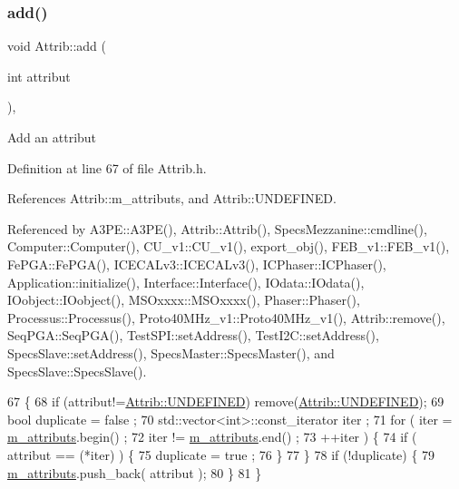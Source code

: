 \subsubsection{\texorpdfstring{add()}{add()}}
{\footnotesize\ttfamily void Attrib\+::add (\begin{DoxyParamCaption}\item[{int}]{attribut }\end{DoxyParamCaption})\hspace{0.3cm}{\ttfamily [inline]}, {\ttfamily [inherited]}}

Add an attribut 

Definition at line 67 of file Attrib.\+h.



References Attrib\+::m\+\_\+attributs, and Attrib\+::\+U\+N\+D\+E\+F\+I\+N\+ED.



Referenced by A3\+P\+E\+::\+A3\+P\+E(), Attrib\+::\+Attrib(), Specs\+Mezzanine\+::cmdline(), Computer\+::\+Computer(), C\+U\+\_\+v1\+::\+C\+U\+\_\+v1(), export\+\_\+obj(), F\+E\+B\+\_\+v1\+::\+F\+E\+B\+\_\+v1(), Fe\+P\+G\+A\+::\+Fe\+P\+G\+A(), I\+C\+E\+C\+A\+Lv3\+::\+I\+C\+E\+C\+A\+Lv3(), I\+C\+Phaser\+::\+I\+C\+Phaser(), Application\+::initialize(), Interface\+::\+Interface(), I\+Odata\+::\+I\+Odata(), I\+Oobject\+::\+I\+Oobject(), M\+S\+Oxxxx\+::\+M\+S\+Oxxxx(), Phaser\+::\+Phaser(), Processus\+::\+Processus(), Proto40\+M\+Hz\+\_\+v1\+::\+Proto40\+M\+Hz\+\_\+v1(), Attrib\+::remove(), Seq\+P\+G\+A\+::\+Seq\+P\+G\+A(), Test\+S\+P\+I\+::set\+Address(), Test\+I2\+C\+::set\+Address(), Specs\+Slave\+::set\+Address(), Specs\+Master\+::\+Specs\+Master(), and Specs\+Slave\+::\+Specs\+Slave().


\begin{DoxyCode}
67                             \{
68     \textcolor{keywordflow}{if} (attribut!=\hyperlink{classAttrib_a69e171d7cc6417835a5a306d3c764235a3a8da2ab97dda18aebab196fe4100531}{Attrib::UNDEFINED}) \textcolor{keyword}{remove}(\hyperlink{classAttrib_a69e171d7cc6417835a5a306d3c764235a3a8da2ab97dda18aebab196fe4100531}{Attrib::UNDEFINED});
69     \textcolor{keywordtype}{bool} duplicate = false ;
70     std::vector<int>::const\_iterator iter ;
71     \textcolor{keywordflow}{for} ( iter  = \hyperlink{classAttrib_ac4bd58a0cc6b38a3b711d609a3d3aacc}{m\_attributs}.begin() ;
72           iter != \hyperlink{classAttrib_ac4bd58a0cc6b38a3b711d609a3d3aacc}{m\_attributs}.end()   ;
73           ++iter ) \{
74       \textcolor{keywordflow}{if} ( attribut == (*iter) ) \{
75         duplicate = true ;
76       \}
77     \}
78     \textcolor{keywordflow}{if} (!duplicate) \{
79       \hyperlink{classAttrib_ac4bd58a0cc6b38a3b711d609a3d3aacc}{m\_attributs}.push\_back( attribut );
80     \}
81   \}
\end{DoxyCode}
\mbox{\label{classHierarchy_ad677774ff38fcb257c04a3a10d471fac}} 
